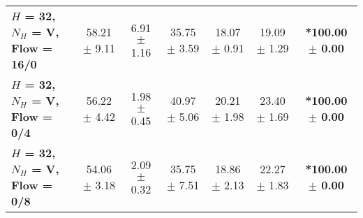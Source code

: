 \begin{table*}[ht]
{\begin{tabular}{lcccccc}
        \textbf{$H$ = 32, $N_H$ = V, Flow = 16/0} & 58.21 $\pm$ 9.11 & 6.91 $\pm$ 1.16 & 35.75 $\pm$ 3.59 & 18.07 $\pm$ 0.91 & 19.09 $\pm$ 1.29 & \textbf{*100.00 $\pm$ 0.00} \\
        \textbf{$H$ = 32, $N_H$ = V, Flow = 0/4} & 56.22 $\pm$ 4.42 & 1.98 $\pm$ 0.45 & 40.97 $\pm$ 5.06 & 20.21 $\pm$ 1.98 & 23.40 $\pm$ 1.69 & \textbf{*100.00 $\pm$ 0.00} \\
        \textbf{$H$ = 32, $N_H$ = V, Flow = 0/8} & 54.06 $\pm$ 3.18 & 2.09 $\pm$ 0.32 & 35.75 $\pm$ 7.51 & 18.86 $\pm$ 2.13 & 22.27 $\pm$ 1.83 & \textbf{*100.00 $\pm$ 0.00} \\
        \bottomrule
    \end{tabular}
    }
\end{table*}



